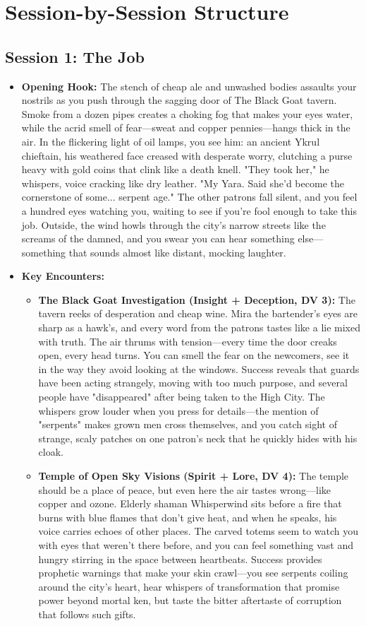\documentclass[11pt]{article}
\begin{document}

\section{Session-by-Session Structure}

\subsection{Session 1: The Job}
\begin{itemize}
\item \textbf{Opening Hook:} The stench of cheap ale and unwashed bodies assaults your nostrils as you push through the sagging door of The Black Goat tavern. Smoke from a dozen pipes creates a choking fog that makes your eyes water, while the acrid smell of fear—sweat and copper pennies—hangs thick in the air. In the flickering light of oil lamps, you see him: an ancient Ykrul chieftain, his weathered face creased with desperate worry, clutching a purse heavy with gold coins that clink like a death knell. "They took her," he whispers, voice cracking like dry leather. "My Yara. Said she'd become the cornerstone of some... serpent age." The other patrons fall silent, and you feel a hundred eyes watching you, waiting to see if you're fool enough to take this job. Outside, the wind howls through the city's narrow streets like the screams of the damned, and you swear you can hear something else—something that sounds almost like distant, mocking laughter.
\item \textbf{Key Encounters:}
  \begin{itemize}
  \item \textbf{The Black Goat Investigation (Insight + Deception, DV 3):} The tavern reeks of desperation and cheap wine. Mira the bartender's eyes are sharp as a hawk's, and every word from the patrons tastes like a lie mixed with truth. The air thrums with tension—every time the door creaks open, every head turns. You can smell the fear on the newcomers, see it in the way they avoid looking at the windows. Success reveals that guards have been acting strangely, moving with too much purpose, and several people have "disappeared" after being taken to the High City. The whispers grow louder when you press for details—the mention of "serpents" makes grown men cross themselves, and you catch sight of strange, scaly patches on one patron's neck that he quickly hides with his cloak.
  \item \textbf{Temple of Open Sky Visions (Spirit + Lore, DV 4):} The temple should be a place of peace, but even here the air tastes wrong—like copper and ozone. Elderly shaman Whisperwind sits before a fire that burns with blue flames that don't give heat, and when he speaks, his voice carries echoes of other places. The carved totems seem to watch you with eyes that weren't there before, and you can feel something vast and hungry stirring in the space between heartbeats. Success provides prophetic warnings that make your skin crawl—you see serpents coiling around the city's heart, hear whispers of transformation that promise power beyond mortal ken, but taste the bitter aftertaste of corruption that follows such gifts.

\end{itemize}
\end{itemize}
\end{document}
